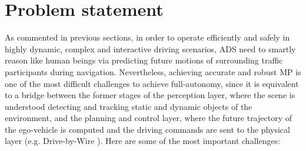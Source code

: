 \section{Problem statement}
\label{sec:1_problem_statement}

As commented in previous sections, in order to operate efficiently and safely in highly dynamic, complex and interactive driving scenarios, \acs{ADS} need to smartly reason like human beings via predicting future motions of surrounding traffic participants during navigation. Nevertheless, achieving accurate and robust \ac{MP} is one of the most difficult challenges to achieve full-autonomy, since it is equivalent to a bridge between the former stages of the perception layer, where the scene is understood detecting and tracking static and dynamic objects of the environment, and the planning and control layer, where the future trajectory of the ego-vehicle is computed and the driving commands are sent to the physical layer (e.g. Drive-by-Wire \cite{arango2020drive}). Here are some of the most important challenges: 

